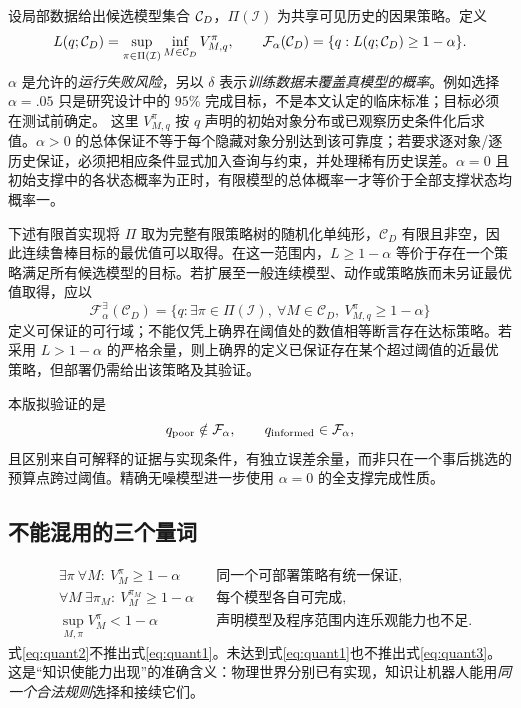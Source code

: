 \documentclass[11pt,a4paper,fontset=fandol]{ctexart}
\theoremstyle{definition}
\theoremstyle{remark}\newtheorem{remark}[theorem]{说明}
\numberwithin{equation}{section}
\begin{document}
设局部数据给出候选模型集合 $\mathcal C_D$，$\Pi(\mathcal I)$ 为共享可见历史的因果策略。定义
\begin{equation}
 L(q;\mathcal C_D)=\sup_{\pi\in\Pi(\mathcal I)}\inf_{M\in\mathcal C_D}V_{M,q}^{\pi},
 \qquad
 \mathcal F_\alpha(\mathcal C_D)=\{q:L(q;\mathcal C_D)\ge1-\alpha\}.
 \label{eq:feas}
\end{equation}
$\alpha$ 是允许的\emph{运行失败风险}，另以 $\delta$ 表示\emph{训练数据未覆盖真模型的概率}。例如选择 $\alpha=.05$ 只是研究设计中的 $95\%$ 完成目标，不是本文认定的临床标准；目标必须在测试前确定。
这里 $V_{M,q}^{\pi}$ 按 $q$ 声明的初始对象分布或已观察历史条件化后求值。$\alpha>0$ 的总体保证不等于每个隐藏对象分别达到该可靠度；若要求逐对象/逐历史保证，必须把相应条件显式加入查询与约束，并处理稀有历史误差。$\alpha=0$ 且初始支撑中的各状态概率为正时，有限模型的总体概率一才等价于全部支撑状态均概率一。

下述有限首实现将 $\Pi$ 取为完整有限策略树的随机化单纯形，$\mathcal C_D$ 有限且非空，因此连续鲁棒目标的最优值可以取得。在这一范围内，$L\ge1-\alpha$ 等价于存在一个策略满足所有候选模型的目标。若扩展至一般连续模型、动作或策略族而未另证最优值取得，应以
\[
 \mathcal F_\alpha^{\exists}(\mathcal C_D)
 =\{q:\exists\pi\in\Pi(\mathcal I),\ \forall M\in\mathcal C_D,
       \ V_{M,q}^{\pi}\ge1-\alpha\}
\]
定义可保证的可行域；不能仅凭上确界在阈值处的数值相等断言存在达标策略。若采用 $L>1-\alpha$ 的严格余量，则上确界的定义已保证存在某个超过阈值的近最优策略，但部署仍需给出该策略及其验证。


本版拟验证的是
\begin{equation}
 q_{\rm poor}\notin\mathcal F_\alpha,
 \qquad q_{\rm informed}\in\mathcal F_\alpha,
 \label{eq:crossing}
\end{equation}
且区别来自可解释的证据与实现条件，有独立误差余量，而非只在一个事后挑选的预算点跨过阈值。精确无噪模型进一步使用 $\alpha=0$ 的全支撑完成性质。

\subsection{不能混用的三个量词}
\begin{align}
 &\exists\pi\ \forall M:\ V_M^\pi\ge1-\alpha
 &&\text{同一个可部署策略有统一保证},\label{eq:quant1}\\
 &\forall M\ \exists\pi_M:\ V_M^{\pi_M}\ge1-\alpha
 &&\text{每个模型各自可完成},\label{eq:quant2}\\
 &\sup_{M,\pi}V_M^\pi<1-\alpha
 &&\text{声明模型及程序范围内连乐观能力也不足}.\label{eq:quant3}
\end{align}
式\eqref{eq:quant2}不推出式\eqref{eq:quant1}。未达到式\eqref{eq:quant1}也不推出式\eqref{eq:quant3}。这是“知识使能力出现”的准确含义：物理世界分别已有实现，知识让机器人能用\emph{同一个合法规则}选择和接续它们。
\end{document}
